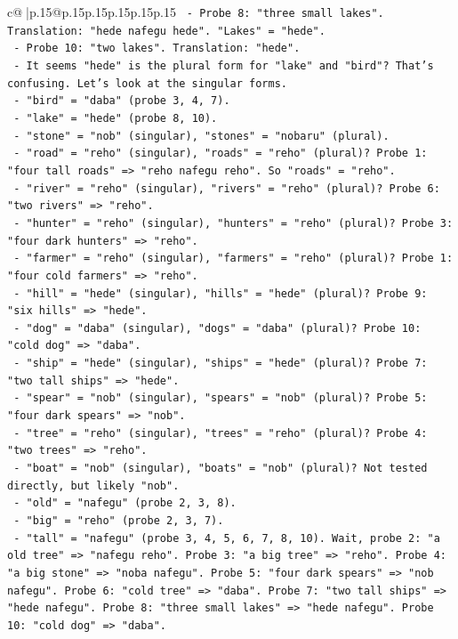 \documentclass{article}
\begin{document}
{\begin{supertabular}{c@{$\;$}|p{.15\linewidth}@{}p{.15\linewidth}p{.15\linewidth}p{.15\linewidth}p{.15\linewidth}p{.15\linewidth}}
{{{\texttt{    {-} Probe 8: "three small lakes". Translation: "hede nafegu hede". "Lakes" = "hede".} \\
\texttt{    {-} Probe 10: "two lakes". Translation: "hede".} \\
\texttt{    {-} It seems "hede" is the plural form for "lake" and "bird"? That's confusing. Let's look at the singular forms.} \\
\texttt{    {-} "bird" = "daba" (probe 3, 4, 7).} \\
\texttt{    {-} "lake" = "hede" (probe 8, 10).} \\
\texttt{    {-} "stone" = "nob" (singular), "stones" = "nobaru" (plural).} \\
\texttt{    {-} "road" = "reho" (singular), "roads" = "reho" (plural)? Probe 1: "four tall roads" => "reho nafegu reho". So "roads" = "reho".} \\
\texttt{    {-} "river" = "reho" (singular), "rivers" = "reho" (plural)? Probe 6: "two rivers" => "reho".} \\
\texttt{    {-} "hunter" = "reho" (singular), "hunters" = "reho" (plural)? Probe 3: "four dark hunters" => "reho".} \\
\texttt{    {-} "farmer" = "reho" (singular), "farmers" = "reho" (plural)? Probe 1: "four cold farmers" => "reho".} \\
\texttt{    {-} "hill" = "hede" (singular), "hills" = "hede" (plural)? Probe 9: "six hills" => "hede".} \\
\texttt{    {-} "dog" = "daba" (singular), "dogs" = "daba" (plural)? Probe 10: "cold dog" => "daba".} \\
\texttt{    {-} "ship" = "hede" (singular), "ships" = "hede" (plural)? Probe 7: "two tall ships" => "hede".} \\
\texttt{    {-} "spear" = "nob" (singular), "spears" = "nob" (plural)? Probe 5: "four dark spears" => "nob".} \\
\texttt{    {-} "tree" = "reho" (singular), "trees" = "reho" (plural)? Probe 4: "two trees" => "reho".} \\
\texttt{    {-} "boat" = "nob" (singular), "boats" = "nob" (plural)? Not tested directly, but likely "nob".} \\
\texttt{    {-} "old" = "nafegu" (probe 2, 3, 8).} \\
\texttt{    {-} "big" = "reho" (probe 2, 3, 7).} \\
\texttt{    {-} "tall" = "nafegu" (probe 3, 4, 5, 6, 7, 8, 10). Wait, probe 2: "a old tree" => "nafegu reho". Probe 3: "a big tree" => "reho". Probe 4: "a big stone" => "noba nafegu". Probe 5: "four dark spears" => "nob nafegu". Probe 6: "cold tree" => "daba". Probe 7: "two tall ships" => "hede nafegu". Probe 8: "three small lakes" => "hede nafegu". Probe 10: "cold dog" => "daba".} \\
}}}
\end{supertabular}}
\end{document}
